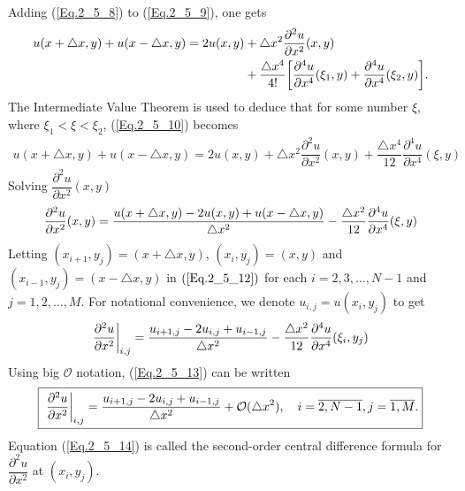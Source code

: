 Adding (\ref{Eq.2_5_8}) to (\ref{Eq.2_5_9}), one gets 
\begin{align}{\label{Eq.2_5_10}}
\begin{split}
u(x+\triangle x, y) + u(x-\triangle x, y) = 2 u(x, y) & +  \triangle x^{2} \dfrac{\partial^2 u}{\partial x^{2}} (x, y) 
\\
&+ \dfrac{\triangle x^{4}}{4!} \bigg [ \dfrac{\partial^4 u}{\partial x^{4}} (\xi_{1}, y)
+ \dfrac{\partial^4 u}{\partial x^{4}} (\xi_{2}, y)  \bigg].
\end{split}
\end{align}
The Intermediate Value Theorem is used to deduce that for some number $\xi$, where $\xi_{1} < \xi < \xi_{2}$, (\ref{Eq.2_5_10}) becomes
\begin{align*}%
u(x+\triangle x, y) + u(x-\triangle x, y) = 2 u(x, y) + \triangle x^{2} \dfrac{\partial^2 u}{\partial x^{2}} (x, y) +  \dfrac{\triangle x^{4}}{12} \dfrac{\partial^4 u}{\partial x^{4}} (\xi, y)
\end{align*}
Solving $ \dfrac{\partial^2 u}{\partial x^{2}} (x, y) $ 
\begin{align}{\label{Eq.2_5_12}}
\dfrac{\partial^2 u}{\partial x^{2}} (x, y) = \dfrac{u(x+\triangle x, y) -  2 u(x, y) + u(x-\triangle x, y)}{\triangle x^{2}} -  \dfrac{\triangle x^{2}}{12} \dfrac{\partial^4 u}{\partial x^{4}} (\xi, y)
\end{align}
Letting $(x_{i+1},y_{j}) = (x+ \triangle x,y)$, $(x_{i},y_{j}) = (x,y)$ and $(x_{i-1},y_{j}) = (x- \triangle x,y)$ in $(\ref{Eq.2_5_12})$ for each $i = 2,3,\dots,N-1$ and $j=1,2,\dots,M$. For notational convenience, we denote $u_{i,j}=u(x_{i},y_{j})$ to get
\begin{align}{\label{Eq.2_5_13}}
\dfrac{\partial^2 u}{\partial x^{2}}\bigg|_{i,j} = \dfrac{u_{i+1,j}-  2 u_{i,j} + u_{i-1,j}}{\triangle x^{2}} -  \dfrac{\triangle x^{2}}{12} \dfrac{\partial^4 u}{\partial x^{4}} (\xi_{i}, y_{j})
\end{align}
Using big $\mathcal{O}$ notation, (\ref{Eq.2_5_13}) can be written
\begin{align}{\label{Eq.2_5_14}}
\fbox{ $ \displaystyle \dfrac{\partial^2 u}{\partial x^{2}}\bigg|_{i,j} = \dfrac{u_{i+1,j}-  2 u_{i,j} + u_{i-1,j}}{\triangle x^{2}} + \mathcal{O}(\triangle x^{2}),\quad i =\overline{2,N-1}, j=\overline{1,M}.$}
\end{align}
Equation (\ref{Eq.2_5_14}) is called the second-order central difference formula for $\dfrac{\partial^{2} u}{\partial x^{2}}$ at $(x_{i}, y_{j})$.
\\

